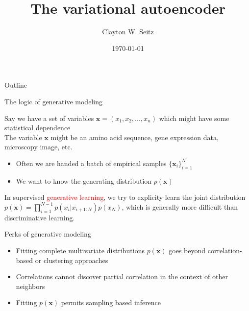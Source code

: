 \documentclass{beamer}					%
\title{The variational autoencoder}	%
\author{Clayton W. Seitz}								%
\date{\today}									%
\begin{document}
\begin{frame}
  \titlepage
\end{frame}

\begin{frame}{Outline}
  \tableofcontents
\end{frame}

%

\begin{frame}{The logic of generative modeling}

Say we have a set of variables $\mathbf{x} = (x_{1},x_{2},...,x_{n})$ which might have some statistical dependence\\
\vspace{0.1in}
The variable $\mathbf{x}$ might be an amino acid sequence, gene expression data, microscopy image, etc.\\
\vspace{0.1in}
\begin{itemize}
\item Often we are handed a batch of empirical samples $\{\mathbf{x}_{i}\}_{i=1}^{N}$
\item We want to know the generating distribution $p(\mathbf{x})$
\end{itemize}

In supervised \textcolor{red}{generative learning}, we try to explicity learn the joint distribution $p(\mathbf{x}) = \prod_{i=1}^{N-1}p(x_{i}|x_{i+1:N})p(x_{N})$, which is generally more difficult than discriminative learning. 

\end{frame}


\begin{frame}{Perks of generative modeling}

\begin{itemize}
\item Fitting complete multivariate distributions $p(\mathbf{x})$ goes beyond correlation-based or clustering approaches
\item Correlations cannot discover partial correlation in the context of other neighbors
\item Fitting $p(\mathbf{x})$ permits sampling based inference
\end{itemize}

\end{frame}
\end{document}
